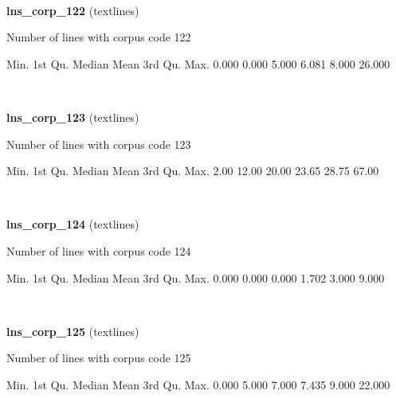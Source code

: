 \documentclass[]{article}
\newenvironment{Shaded}{\begin{snugshade}}{\end{snugshade}}
\newcommand{\FloatTok}[1]{\textcolor[rgb]{0.00,0.00,0.81}{{#1}}}
\newcommand{\NormalTok}[1]{{#1}}
\begin{document}
~

\vspace{1em}

\textbf{lns\_corp\_122} (textlines)

Number of lines with corpus code 122

\begin{Shaded}
\begin{Highlighting}[]
   \NormalTok{Min. 1st Qu.  Median    Mean 3rd Qu.    Max. }
  \FloatTok{0.000}   \FloatTok{0.000}   \FloatTok{5.000}   \FloatTok{6.081}   \FloatTok{8.000}  \FloatTok{26.000} 
\end{Highlighting}
\end{Shaded}

~

\vspace{1em}

\textbf{lns\_corp\_123} (textlines)

Number of lines with corpus code 123

\begin{Shaded}
\begin{Highlighting}[]
   \NormalTok{Min. 1st Qu.  Median    Mean 3rd Qu.    Max. }
   \FloatTok{2.00}   \FloatTok{12.00}   \FloatTok{20.00}   \FloatTok{23.65}   \FloatTok{28.75}   \FloatTok{67.00} 
\end{Highlighting}
\end{Shaded}

~

\vspace{1em}

\textbf{lns\_corp\_124} (textlines)

Number of lines with corpus code 124

\begin{Shaded}
\begin{Highlighting}[]
   \NormalTok{Min. 1st Qu.  Median    Mean 3rd Qu.    Max. }
  \FloatTok{0.000}   \FloatTok{0.000}   \FloatTok{0.000}   \FloatTok{1.702}   \FloatTok{3.000}   \FloatTok{9.000} 
\end{Highlighting}
\end{Shaded}

~

\vspace{1em}

\textbf{lns\_corp\_125} (textlines)

Number of lines with corpus code 125

\begin{Shaded}
\begin{Highlighting}[]
   \NormalTok{Min. 1st Qu.  Median    Mean 3rd Qu.    Max. }
  \FloatTok{0.000}   \FloatTok{5.000}   \FloatTok{7.000}   \FloatTok{7.435}   \FloatTok{9.000}  \FloatTok{22.000} 
\end{Highlighting}
\end{Shaded}
\end{document}
